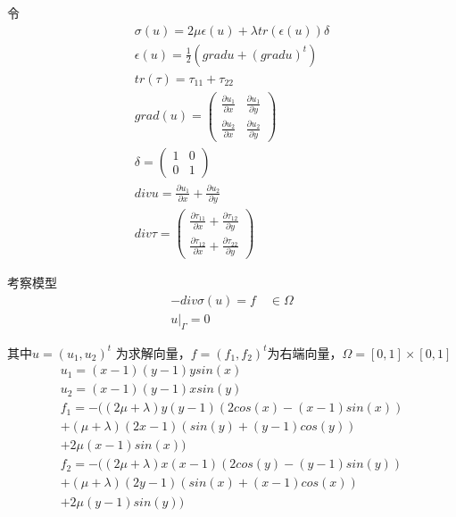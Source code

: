 \documentclass[a4paper,UTF8,titlepage]{ctexart}
\begin{document}
令
$$
\begin{matrix}
	\sigma(u) = 2 \mu \epsilon(u) + \lambda tr(\epsilon(u)) \delta \\
	\epsilon(u) = \frac{1}{2} (grad u + (grad u)^t) \\
	tr(\tau) = \tau_{11} + \tau_{22} \\
	grad(u) = \begin{pmatrix}
		\frac{\partial u_1}{\partial x} & \frac{\partial u_1}{\partial y} \\
		\frac{\partial u_2}{\partial x} &
		\frac{\partial u_2}{\partial y}
	\end{pmatrix} \\
	\delta = \begin{pmatrix}
		1 & 0 \\
		0 & 1
	\end{pmatrix} \\
	div u = \frac{\partial u_1}{\partial x} + \frac{\partial u_2}{\partial y} \\
	div \tau = \begin{pmatrix}
		\frac{\partial \tau_{11}}{\partial x} + \frac{\partial \tau_{12}}{\partial y} \\
		\frac{\partial \tau_{12}}{\partial x} + \frac{\partial \tau_{22}}{\partial 
		y}
	\end{pmatrix}
\end{matrix}
$$

考察模型
$$
\begin{matrix}
	-div \sigma(u) = f \quad \in \Omega  \\
	u |_{\Gamma} = 0
\end{matrix}
$$ 
\par
其中$ u = (u_1,u_2)^t $ 为求解向量，$ f = (f_1,f_2)^t $为右端向量，$ \Omega = [0,1] \times [0,1] $
$$
\begin{matrix}
	u_1 = (x - 1)(y - 1) y sin(x) 
	\\
	u_2 = (x - 1)(y - 1) x sin(y) 
	\\
	f_1 = -((2 \mu + \lambda) y (y - 1) (2 cos(x) - (x - 1) sin(x)) \\
	+ (\mu + \lambda) (2 x - 1) (sin(y) + (y - 1) cos(y)) \\
	+ 2 \mu (x - 1) sin(x)) 
	\\
	f_2 = -((2 \mu + \lambda) x (x - 1) (2 cos(y) - (y - 1) sin(y)) \\
	+ (\mu + \lambda) (2 y - 1) (sin(x) + (x - 1) cos(x)) \\ 
	+ 2 \mu (y - 1) sin(y))
\end{matrix}
$$
\end{document}
